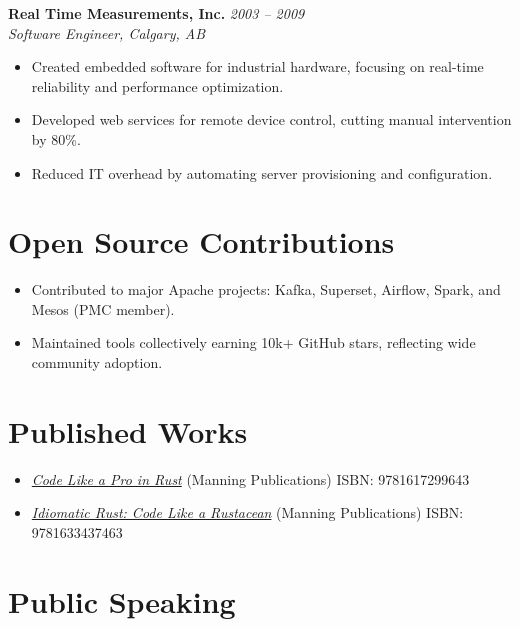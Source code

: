 \documentclass[margin,line]{resume}
\begin{document}
\begin{resume}
\filbreak
\textbf{Real Time Measurements, Inc.} \hfill \textit{2003 -- 2009}\\
\textit{Software Engineer, Calgary, AB}

\begin{itemize}
    \item Created embedded software for industrial hardware, focusing on real-time reliability and performance optimization.
    \item Developed web services for remote device control, cutting manual intervention by 80\%.
    \item Reduced IT overhead by automating server provisioning and configuration.
\end{itemize}

\vspace{10pt}

\section{Open Source Contributions}

\begin{itemize}[partopsep=0mm]
    \item Contributed to major Apache projects: Kafka, Superset, Airflow, Spark, and Mesos (PMC member).
    \item Maintained tools collectively earning 10k+ GitHub stars, reflecting wide community adoption.
\end{itemize}

\vspace{10pt}

\section{Published Works}

\begin{itemize}[partopsep=0mm]
    \item \href{https://www.manning.com/books/code-like-a-pro-in-rust}{\textit{Code Like a Pro in Rust}} (Manning Publications) \hfill ISBN: 9781617299643
    \item \href{https://www.manning.com/books/idiomatic-rust}{\textit{Idiomatic Rust: Code Like a Rustacean}} (Manning Publications) \hfill ISBN: 9781633437463
\end{itemize}

\vspace{10pt}

\section{Public Speaking}


\end{resume}
\end{document}
